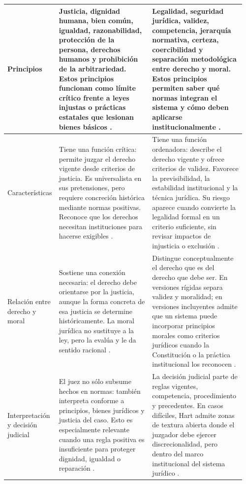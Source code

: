 \documentclass[
	spanish, %
	letterpaper, oneside
]{article}
\begin{document}
\begin{landscape}
\begin{longtable}{@{}p{0.18\linewidth}p{0.39\linewidth}p{0.39\linewidth}@{}}
Principios &
Justicia, dignidad humana, bien común, igualdad, razonabilidad, protección de la persona, derechos humanos y prohibición de la arbitrariedad. Estos principios funcionan como límite crítico frente a leyes injustas o prácticas estatales que lesionan bienes básicos \citep{finnisEstudiosTeoriaDerecho2017,LeyGeneralVictimas}. &
Legalidad, seguridad jurídica, validez, competencia, jerarquía normativa, certeza, coercibilidad y separación metodológica entre derecho y moral. Estos principios permiten saber qué normas integran el sistema y cómo deben aplicarse institucionalmente \citep{LeyAmparoReglamentaria,ruizrodriguezFilosofiaDerecho2009}. \\
\midrule

Características &
Tiene una función crítica: permite juzgar el derecho vigente desde criterios de justicia. Es universalista en sus pretensiones, pero requiere concreción histórica mediante normas positivas. Reconoce que los derechos necesitan instituciones para hacerse exigibles \citep{finnisEstudiosTeoriaDerecho2017,ruizrodriguezFilosofiaDerecho2009}. &
Tiene una función ordenadora: describe el derecho vigente y ofrece criterios de validez. Favorece la previsibilidad, la estabilidad institucional y la técnica jurídica. Su riesgo aparece cuando convierte la legalidad formal en un criterio suficiente, sin revisar impactos de injusticia o exclusión \citep{rojas-gonzalezFilosofiaDerecho2018}. \\
\midrule

Relación entre derecho y moral &
Sostiene una conexión necesaria: el derecho debe orientarse por la justicia, aunque la forma concreta de esa justicia se determine históricamente. La moral jurídica no sustituye a la ley, pero la evalúa y le da sentido racional \citep{finnisEstudiosTeoriaDerecho2017,ruizrodriguezFilosofiaDerecho2009}. &
Distingue conceptualmente el derecho que es del derecho que debe ser. En versiones rígidas separa validez y moralidad; en versiones incluyentes admite que un sistema puede incorporar principios morales como criterios jurídicos cuando la Constitución o la práctica institucional los reconocen \citep{rojas-gonzalezFilosofiaDerecho2018}. \\
\midrule

Interpretación y decisión judicial &
El juez no sólo subsume hechos en normas: también interpreta conforme a principios, bienes jurídicos y justicia del caso. Esto es especialmente relevante cuando una regla positiva es insuficiente para proteger dignidad, igualdad o reparación \citep{LeyGeneralVictimas}. &
La decisión judicial parte de reglas vigentes, competencia, procedimiento y precedentes. En casos difíciles, Hart admite zonas de textura abierta donde el juzgador debe ejercer discrecionalidad, pero dentro del marco institucional del sistema jurídico \citep{ruizrodriguezFilosofiaDerecho2009}. \\
\midrule


\end{longtable}
\end{landscape}
\end{document}
